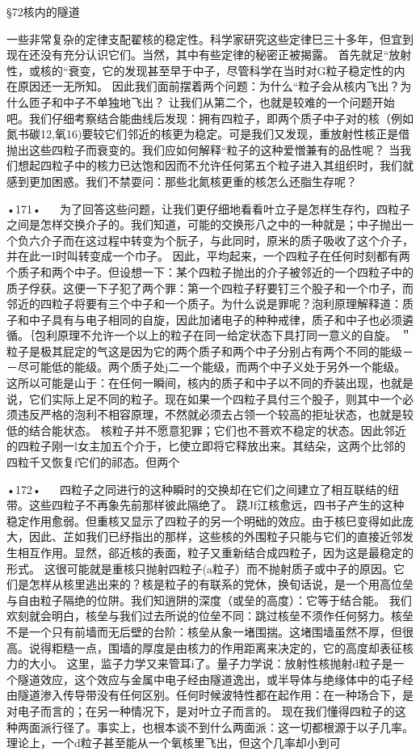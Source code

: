 §72核内的隧道

一些非常复杂的定律支配翟核的稳定性。科学家研究这些定律巳三十多年，但宜到现在还没有充分认识它们。当然，其中有些定律的秘密正被揭露。
首先就足“放射性，或核的“衰变，它的发现甚至早于中子，尽管科学在当时对G粒子稳定性的内在原因还一无所知。
因此我们面前摆着两个问题：为什么“粒子会从核内飞出？为什么匝子和中子不单独地飞出？
让我们从第二个，也就是较难的一个问题开始吧。我们仔细考察结合能曲线后发现：拥有四粒子，即两个质子中子对的核（例如氮书碳12,氧16)要较它们邻近的核更为稳定。可是我们又发现，重放射性核正是借抛出这些四粒子而衰变的。我们应如何解释“粒子的这种爱憎兼有的品性呢？
当我们想起四粒子中的核力已达饱和因而不允许任何笫五个粒子进入其组织时，我们就感到更加困惑。我们不禁耍问：那些北氮核更重的核怎么还脂生存呢？

•171•
  
为了回答这些问题，让我们更仔细地看看叶立子是怎样生存彴，四粒子之间是怎样交换介子的。我们知道，可能的交换形八之中的一种就是；中子抛出一个负六介子而在这过程中转变为个朊子，与此同时，原米的质子吸收了这个介子，并在此一I时叫转变成一个巾子。
因此，平均起来，一个四粒子在任何时刻都有两个质子和两个中子。但设想一下：某个四粒子抛出的介子被邻近的一个四粒子中的质子俘获。这便一下子犯了两个罪：第一个四粒子籽要钉三个股子和一个巾子，而邻近的四粒子将要有三个中子和一个质子。为什么说是罪呢？泡利原理解释道：质子和中子具有与电子相同的自旋，因此加诸电子的种种戒律，质子和中子也必须遴循。｛包利原理不允许一个以上的粒子在同一给定状态下具打同一意义的自旋。
＂粒子是极其屁定的气这是因为它的两个质子和两个中子分别占有两个不同的能级－－尽可能低的能级。两个质子处j二一个能级，而两个中子义处于另外一个能级。这所以可能是山于：在任何一瞬间，核内的质子和中子以不同的乔装出现，也就是说，它们实际上足不同的粒子。现在如果一个四粒子具付三个股子，则其中一个必须违反严格的泡利不相容原理，不然就必须去占领一个较高的拒址状态，也就是较低的结合能状态。
核粒子并不愿意犯罪；它们也不菩欢不稳定的状态。因此邻近的四粒子刚一l女主加五个介于，匕使立即将它释放出来。其结朵，这两个比邻的四粒千又恢复f它们的祁态。但两个

•172•
  
四粒子之同进行的这种瞬时的交换却在它们之间建立了相互联结的纽带。这些四粒子不再象先前那样彼此隔绝了。
跷Jf江核愈远，四书子产生的这种稳定作用愈弱。但重核又显示了四粒子的另一个明础的效应。由于核巳变得如此庞大，因此、芷如我们已纾指出的那样，这些核的外围粒子只能与它们的直接近邻发生相互作用。显然，郤近核的表面，粒子又重新结合成四粒子，因为这是最稳定的形式。
这很可能就是重核只抛射四粒子(a粒子）而不抛射质子或中子的原因。它们是怎样从核里逃出来的？核是粒子的有联系的党休，换旬话说，是一个用高位垒与自由粒子隔绝的位阱。我们知逍阱的深度（或垒的高度）：它等于结合能。
我们欢刻就会明白，核垒与我们过去所说的位垒不同：跳过核垒不须作任何努力。核垒不是一个只有前墙而无后壁的台阶：核垒从象一堵围揣。这堵围墙虽然不厚，但很高。说得粔糙一点，围墙的厚度是由核力的作用距离来决定的，它的高度却表征核力的大小。
这里，监子力学又来管耳i了。量子力学说：放射性核抛射d粒子是一个隧道效应，这个效应与金属中电子经由隧道逸出，或半导体与绝缘体中的屯子经由隧道渗入传导带没有任何区别。任何时候波特性都在起作用：在一种场合下，是对电子而言的；在另一种情况下，是对叶立子而言的。
现在我们懂得四粒子的这种两面派行径了。事实上，也根本谈不到什么两面派：这一切都根源于以子几率。理论上，一个d粒子甚至能从一个氧核里飞出，但这个几率却小到可

